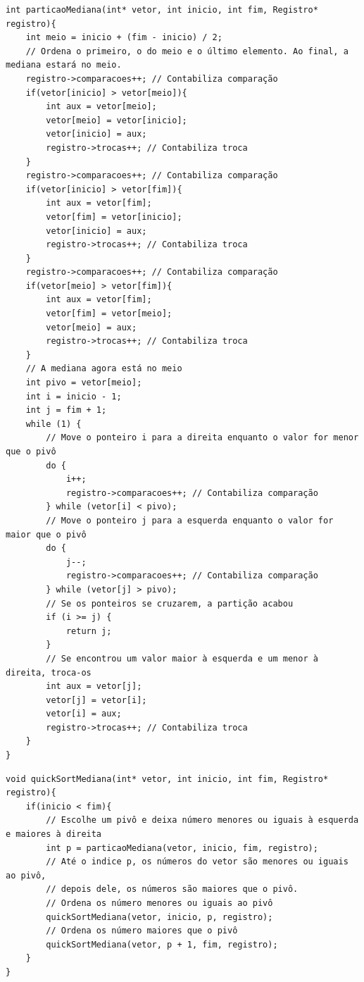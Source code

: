 \documentclass[12pt]{article}
\begin{document}
\begin{lstlisting}
int particaoMediana(int* vetor, int inicio, int fim, Registro* registro){
    int meio = inicio + (fim - inicio) / 2;
    // Ordena o primeiro, o do meio e o último elemento. Ao final, a mediana estará no meio.
    registro->comparacoes++; // Contabiliza comparação
    if(vetor[inicio] > vetor[meio]){
        int aux = vetor[meio];
        vetor[meio] = vetor[inicio];
        vetor[inicio] = aux;
        registro->trocas++; // Contabiliza troca
    }
    registro->comparacoes++; // Contabiliza comparação
    if(vetor[inicio] > vetor[fim]){
        int aux = vetor[fim];
        vetor[fim] = vetor[inicio];
        vetor[inicio] = aux;
        registro->trocas++; // Contabiliza troca
    }
    registro->comparacoes++; // Contabiliza comparação
    if(vetor[meio] > vetor[fim]){
        int aux = vetor[fim];
        vetor[fim] = vetor[meio];
        vetor[meio] = aux;
        registro->trocas++; // Contabiliza troca
    }
    // A mediana agora está no meio
    int pivo = vetor[meio];
    int i = inicio - 1;
    int j = fim + 1;
    while (1) {
        // Move o ponteiro i para a direita enquanto o valor for menor que o pivô
        do {
            i++;
            registro->comparacoes++; // Contabiliza comparação
        } while (vetor[i] < pivo);
        // Move o ponteiro j para a esquerda enquanto o valor for maior que o pivô
        do {
            j--;
            registro->comparacoes++; // Contabiliza comparação
        } while (vetor[j] > pivo);
        // Se os ponteiros se cruzarem, a partição acabou
        if (i >= j) {
            return j;
        } 
        // Se encontrou um valor maior à esquerda e um menor à direita, troca-os
        int aux = vetor[j];
        vetor[j] = vetor[i];
        vetor[i] = aux;
        registro->trocas++; // Contabiliza troca
    }
}
\end{lstlisting}

\begin{lstlisting}
void quickSortMediana(int* vetor, int inicio, int fim, Registro* registro){
    if(inicio < fim){
        // Escolhe um pivô e deixa número menores ou iguais à esquerda e maiores à direita
        int p = particaoMediana(vetor, inicio, fim, registro); 
        // Até o indice p, os números do vetor são menores ou iguais ao pivô,
        // depois dele, os números são maiores que o pivô.
        // Ordena os número menores ou iguais ao pivô
        quickSortMediana(vetor, inicio, p, registro); 
        // Ordena os número maiores que o pivô
        quickSortMediana(vetor, p + 1, fim, registro); 
    }
}
\end{lstlisting}
\end{document}
